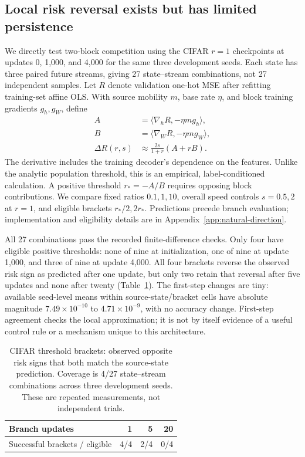 \subsection{Local risk reversal exists but has limited persistence}
We directly test two-block competition using the CIFAR $r=1$ checkpoints at updates 0, 1,000, and 4,000 for the same three development seeds. Each state has three paired future streams, giving 27 state--stream combinations, not 27 independent samples. Let $R$ denote validation one-hot MSE after refitting training-set affine OLS. With source mobility $m$, base rate $\eta$, and block training gradients $g_h,g_W$, define
\begin{align}
 A&=\langle\nabla_h R,-\eta m g_h\rangle,\nonumber\\
 B&=\langle\nabla_W R,-\eta m g_W\rangle,\nonumber\\
 \Delta R(r,s)&\approx \frac{2s}{1+r}(A+rB).
 \label{eq:natural-local}
\end{align}
The derivative includes the training decoder's dependence on the features. Unlike the analytic population threshold, this is an empirical, label-conditioned calculation. A positive threshold $r_*=-A/B$ requires opposing block contributions. We compare fixed ratios $0.1,1,10$, overall speed controls $s=0.5,2$ at $r=1$, and eligible brackets $r_*/2,2r_*$. Predictions precede branch evaluation; implementation and eligibility details are in Appendix~\ref{app:natural-direction}.

All 27 combinations pass the recorded finite-difference checks. Only four have eligible positive thresholds: none of nine at initialization, one of nine at update 1,000, and three of nine at update 4,000. All four brackets reverse the observed risk sign as predicted after one update, but only two retain that reversal after five updates and none after twenty (Table~\ref{tab:natural-threshold}). The first-step changes are tiny: available seed-level means within source-state/bracket cells have absolute magnitude $7.49\times10^{-10}$ to $4.71\times10^{-9}$, with no accuracy change. First-step agreement checks the local approximation; it is not by itself evidence of a useful control rule or a mechanism unique to this architecture.

\begin{table}[t]
\centering\small
\caption{CIFAR threshold brackets: observed opposite risk signs that both match the source-state prediction. Coverage is 4/27 state--stream combinations across three development seeds. These are repeated measurements, not independent trials.}
\label{tab:natural-threshold}
\begin{tabular}{lrrr}
\toprule
Branch updates&1&5&20\\\midrule
Successful brackets / eligible&4/4&2/4&0/4\\
\bottomrule
\end{tabular}
\end{table}

